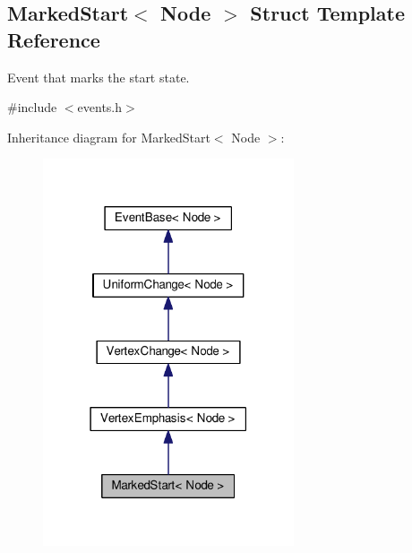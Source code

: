 \hypertarget{structMarkedStart}{}\subsection{Marked\+Start$<$ Node $>$ Struct Template Reference}
\label{structMarkedStart}


Event that marks the start state.  




{\ttfamily \#include $<$events.\+h$>$}



Inheritance diagram for Marked\+Start$<$ Node $>$\+:\nopagebreak
\begin{figure}[H]
\begin{center}
\leavevmode
\includegraphics[width=210pt]{structMarkedStart__inherit__graph}
\end{center}
\end{figure}


